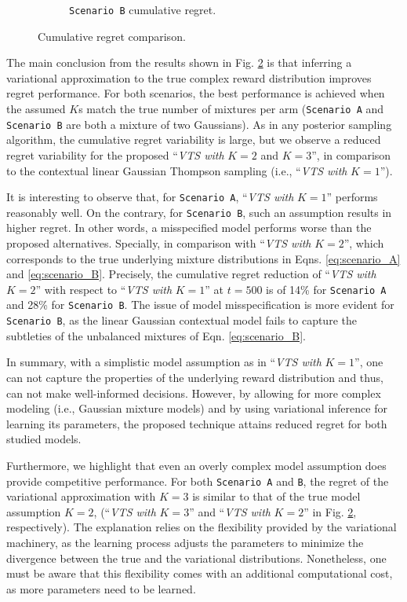 \documentclass[10pt]{article}
\newcommand{\ie}{i.e., }
\begin{document}
\begin{figure}[!h]
\begin{subfigure}[b]{0.49\textwidth}
		\caption{\texttt{Scenario B} cumulative regret.}
		\label{fig:model_b_cumregret}
	\end{subfigure}%
	\caption{Cumulative regret comparison.}
	\label{fig:cumregret_comparison}
\end{figure}

The main conclusion from the results shown in Fig. \ref{fig:cumregret_comparison} is that inferring a variational approximation to the true complex reward distribution improves regret performance. For both scenarios, the best performance is achieved when the assumed $K$s match the true number of mixtures per arm (\texttt{Scenario A} and \texttt{Scenario B} are both a mixture of two Gaussians). As in any posterior sampling algorithm, the cumulative regret variability is large, but we observe a reduced regret variability for the proposed ``\textit{VTS with }$K=2$ and $K=3$'', in comparison to the contextual linear Gaussian Thompson sampling (\ie ``\textit{VTS with }$K=1$'').

It is interesting to observe that, for \texttt{Scenario A}, ``\textit{VTS with }$K=1$'' performs reasonably well. On the contrary, for \texttt{Scenario B}, such an assumption results in higher regret. In other words, a misspecified model performs worse than the proposed alternatives. Specially, in comparison with ``\textit{VTS with }$K=2$'', which corresponds to the true underlying mixture distributions in Eqns. \ref{eq:scenario_A} and \ref{eq:scenario_B}. Precisely, the cumulative regret reduction of ``\textit{VTS with }$K=2$'' with respect to ``\textit{VTS with }$K=1$'' at $t=500$ is of 14\% for \texttt{Scenario A} and 28\% for \texttt{Scenario B}.
The issue of model misspecification is more evident for \texttt{Scenario B}, as the linear Gaussian contextual model fails to capture the subtleties of the unbalanced mixtures of Eqn. \ref{eq:scenario_B}.

In summary, with a simplistic model assumption as in ``\textit{VTS with }$K=1$'', one can not capture the properties of the underlying reward distribution and thus, can not make well-informed decisions. However, by allowing for more complex modeling (\ie Gaussian mixture models) and by using variational inference for learning its parameters, the proposed technique attains reduced regret for both studied models.

Furthermore, we highlight that even an overly complex model assumption does provide competitive performance. For both \texttt{Scenario A} and \texttt{B}, the regret of the variational approximation with $K=3$ is similar to that of the true model assumption $K=2$, (``\textit{VTS with }$K=3$'' and ``\textit{VTS with }$K=2$'' in Fig. \ref{fig:cumregret_comparison}, respectively). The explanation relies on the flexibility provided by the variational machinery, as the learning process adjusts the parameters to minimize the divergence between the true and the variational distributions. Nonetheless, one must be aware that this flexibility comes with an additional computational cost, as more parameters need to be learned.
\end{document}
